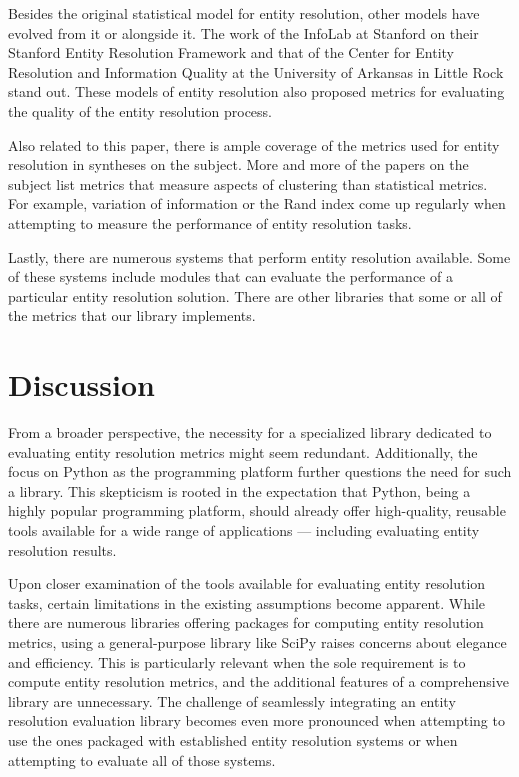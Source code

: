 \documentclass[11pt]{article}
\begin{document}
    Besides the original statistical model for entity resolution, other models
    have evolved from it or alongside it.
    The work of the InfoLab at Stanford on their Stanford Entity Resolution
    Framework\cite{Ben2009Swoosh} and that of the Center for Entity Resolution
    and Information Quality at the University of Arkansas in Little
    Rock\cite{tal2007algebraic} stand out.
    These models of entity resolution also proposed metrics for evaluating the
    quality of the entity resolution process\cite{Men10,Tal11}.

    Also related to this paper, there is ample coverage of the metrics used for
    entity resolution in syntheses on the subject\cite{vldb2010,hitesh2012}.
    More and more of the papers on the subject list metrics that measure aspects
    of clustering than statistical metrics.
    For example, variation of information\cite{Men10} or the Rand
    index\cite{tal2007algebraic} come up regularly when attempting to measure
    the performance of entity resolution tasks.

    Lastly, there are numerous systems that perform entity resolution available.
    Some of these systems include modules that can evaluate the performance of
    a particular entity resolution
    solution\cite{fever2009,magellan2020,oyster2012}.
    There are other libraries that some or all of the metrics that our library
    implements\cite{nmeth2020scipy,ereval}.

    \section{Discussion}\label{sec:discussion}

    From a broader perspective, the necessity for a specialized library
    dedicated to evaluating entity resolution metrics might seem redundant.
    Additionally, the focus on Python as the programming platform further
    questions the need for such a library.
    This skepticism is rooted in the expectation that Python, being a highly
    popular programming platform, should already offer high-quality, reusable
    tools available for a wide range of applications --- including evaluating
    entity resolution results.
    
    Upon closer examination of the tools available for evaluating entity
    resolution tasks, certain limitations in the existing assumptions become
    apparent.
    While there are numerous libraries offering packages for computing entity
    resolution metrics, using a general-purpose library like SciPy raises
    concerns about elegance and efficiency.
    This is particularly relevant when the sole requirement is to compute entity
    resolution metrics, and the additional features of a comprehensive library
    are unnecessary.
    The challenge of seamlessly integrating an entity resolution evaluation
    library becomes even more pronounced when attempting to use the ones
    packaged with established entity resolution
    systems\cite{oyster2012,jedai2017,deepm2020,magellan2020} or when attempting
    to evaluate all of those systems.
    
\end{document}
